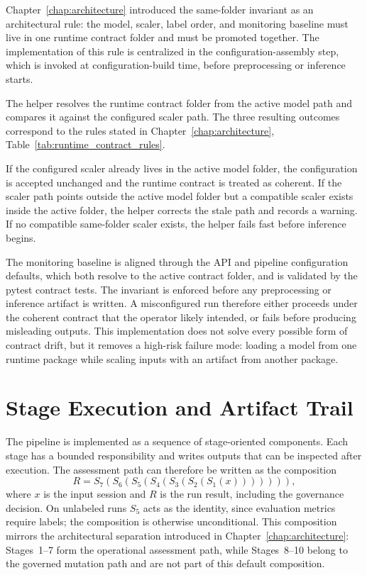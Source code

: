 Chapter~\ref{chap:architecture} introduced the same-folder invariant as an architectural rule: the model, scaler, label order, and monitoring baseline must live in one runtime contract folder and must be promoted together. The implementation of this rule is centralized in the configuration-assembly step, which is invoked at configuration-build time, before preprocessing or inference starts.

The helper resolves the runtime contract folder from the active model path and compares it against the configured scaler path. The three resulting outcomes correspond to the rules stated in Chapter~\ref{chap:architecture}, Table~\ref{tab:runtime_contract_rules}.

If the configured scaler already lives in the active model folder, the configuration is accepted unchanged and the runtime contract is treated as coherent. If the scaler path points outside the active model folder but a compatible scaler exists inside the active folder, the helper corrects the stale path and records a warning. If no compatible same-folder scaler exists, the helper fails fast before inference begins.

The monitoring baseline is aligned through the API and pipeline configuration defaults, which both resolve to the active contract folder, and is validated by the pytest contract tests. The invariant is enforced before any preprocessing or inference artifact is written. A misconfigured run therefore either proceeds under the coherent contract that the operator likely intended, or fails before producing misleading outputs. This implementation does not solve every possible form of contract drift, but it removes a high-risk failure mode: loading a model from one runtime package while scaling inputs with an artifact from another package.

\section{Stage Execution and Artifact Trail}
\label{sec:stage_oriented_pipeline}

The pipeline is implemented as a sequence of stage-oriented components. Each stage has a bounded responsibility and writes outputs that can be inspected after execution. The assessment path can therefore be written as the composition
\[
R = S_7\!\left(S_6\!\left(S_5\!\left(S_4\!\left(S_3\!\left(S_2\!\left(S_1(x)\right)\right)\right)\right)\right)\right),
\]
where $x$ is the input session and $R$ is the run result, including the governance decision. On unlabeled runs $S_5$ acts as the identity, since evaluation metrics require labels; the composition is otherwise unconditional. This composition mirrors the architectural separation introduced in Chapter~\ref{chap:architecture}: Stages~1--7 form the operational assessment path, while Stages~8--10 belong to the governed mutation path and are not part of this default composition.

